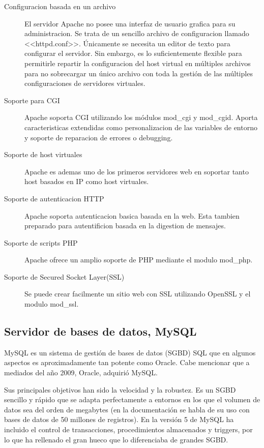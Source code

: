 \begin{description}
    \item[Configuracion basada en un archivo] El servidor Apache no posee una interfaz de usuario grafica para su administracion. Se trata de un sencillo archivo de configuracion llamado <<httpd.conf>>. Únicamente se necesita un editor de texto para configurar el servidor. Sin embargo, es lo suficientemente flexible para permitirle repartir la configuracion del host virtual en múltiples archivos para no sobrecargar un único archivo con toda la gestión de las múltiples configuraciones de servidores virtuales.
    
    \item[Soporte para CGI] Apache soporta CGI utilizando los módulos mod\_cgi y mod\_cgid. Aporta caracteristicas extendidas como personalizacion de las variables de entorno y soporte de reparacion de errores o debugging.
    
    \item[Soporte de host virtuales] Apache es ademas uno de los primeros servidores web en soportar tanto host basados en IP como host virtuales.
    
    \item[Soporte de autenticacion HTTP] Apache soporta autenticacion basica basada en la web. Esta tambien preparado para autentificion basada en la digestion de mensajes.
    
   \item[Soporte de scripts PHP] Apache ofrece un amplio soporte de PHP mediante el modulo mod\_php.
   
   \item[Soporte de Secured Socket Layer(SSL)] Se puede crear facilmente un sitio web con SSL utilizando OpenSSL y el modulo mod\_ssl.
\end{description}




\subsection{Servidor de bases de datos, MySQL}
MySQL es un sistema de gestión de bases de datos (SGBD) SQL que en algunos aspectos es aproximadamente tan potente como Oracle. Cabe mencionar que a mediados del año 2009, Oracle, adquirió MySQL.



Sus principales objetivos han sido la velocidad y la robustez. Es un SGBD sencillo y rápido que se adapta perfectamente a entornos en los que el volumen de datos sea del orden de megabytes (en la documentación se habla de su uso con bases de datos de 50 millones de registros). En la versión 5 de MySQL ha incluido el control de transacciones, procedimientos almacenados y triggers, por lo que ha rellenado el gran hueco que lo diferenciaba de grandes SGBD.




